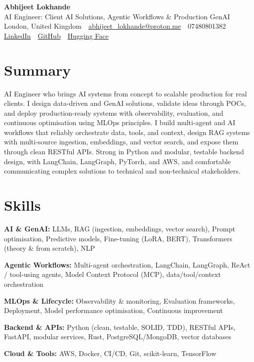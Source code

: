 \documentclass[10pt,a4paper]{article}
\newcommand{\sep}{\,\textcolor{accent!60}{\textbar}\,}
\begin{document}
\begin{center}
  {\fontsize{24}{26}\selectfont\bfseries Abhijeet Lokhande}\\[3pt]
  {\color{accent}\large AI Engineer: Client AI Solutions, Agentic Workflows \& Production GenAI}\\[5pt]
  {\small
    London, United Kingdom \sep
    \href{mailto:abhijeet_lokhande@proton.me}{abhijeet\_lokhande@proton.me} \sep
    07480801382 \\[2pt]
    \href{https://www.linkedin.com/in/ablds/}{LinkedIn} \sep
    \href{https://github.com/abhijeetscode}{GitHub} \sep
    \href{https://huggingface.co/ab-ai}{Hugging Face}
  }
\end{center}
\vspace{2pt}

\section{Summary}
AI Engineer who brings AI systems from concept to scalable production for real clients. I design data-driven and GenAI solutions, validate ideas through POCs, and deploy production-ready systems with observability, evaluation, and continuous optimisation using MLOps principles. I build multi-agent and AI workflows that reliably orchestrate data, tools, and context, design RAG systems with multi-source ingestion, embeddings, and vector search, and expose them through clean RESTful APIs. Strong in Python and modular, testable backend design, with LangChain, LangGraph, PyTorch, and AWS, and comfortable communicating complex solutions to technical and non-technical stakeholders.

\section{Skills}
\begin{tight}
  \item[\textcolor{accent}{\small$\bullet$}] \textbf{AI \& GenAI:} LLMs, RAG (ingestion, embeddings, vector search), Prompt optimisation, Predictive models, Fine-tuning (LoRA, BERT), Transformers (theory \& from scratch), NLP
  \item[\textcolor{accent}{\small$\bullet$}] \textbf{Agentic Workflows:} Multi-agent orchestration, LangChain, LangGraph, ReAct / tool-using agents, Model Context Protocol (MCP), data/tool/context orchestration
  \item[\textcolor{accent}{\small$\bullet$}] \textbf{MLOps \& Lifecycle:} Observability \& monitoring, Evaluation frameworks, Deployment, Model performance optimisation, Continuous improvement
  \item[\textcolor{accent}{\small$\bullet$}] \textbf{Backend \& APIs:} Python (clean, testable, SOLID, TDD), RESTful APIs, FastAPI, modular services, Rust, PostgreSQL/MongoDB, vector databases
  \item[\textcolor{accent}{\small$\bullet$}] \textbf{Cloud \& Tools:} AWS, Docker, CI/CD, Git, scikit-learn, TensorFlow
\end{tight}
\end{document}
